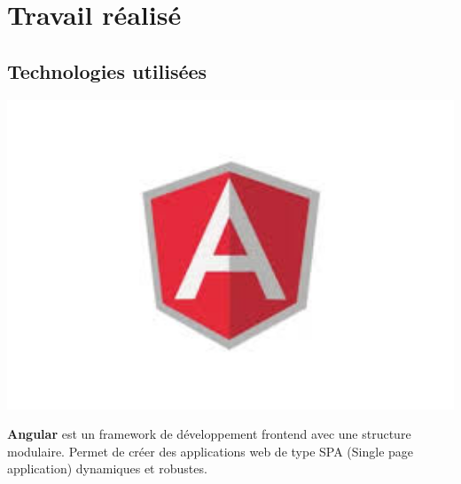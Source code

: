 \chapter*{Travail réalisé}
\setcounter{section}{0} %

\section{Technologies utilisées}

\begin{center}
    \begin{minipage}{\textwidth}
        \begin{minipage}{0.2\textwidth}
            \centering
            \includegraphics[width=1\textwidth]{images/logo/angular.jpeg}
        \end{minipage}\hfill
        \begin{minipage}{0.75\textwidth}
            \textbf{Angular} est un framework de développement frontend avec une structure modulaire. Permet de créer des applications web de type SPA (Single page application) dynamiques et robustes.
        \end{minipage}
    \end{minipage}

    \vspace{2em} %


\end{center}
